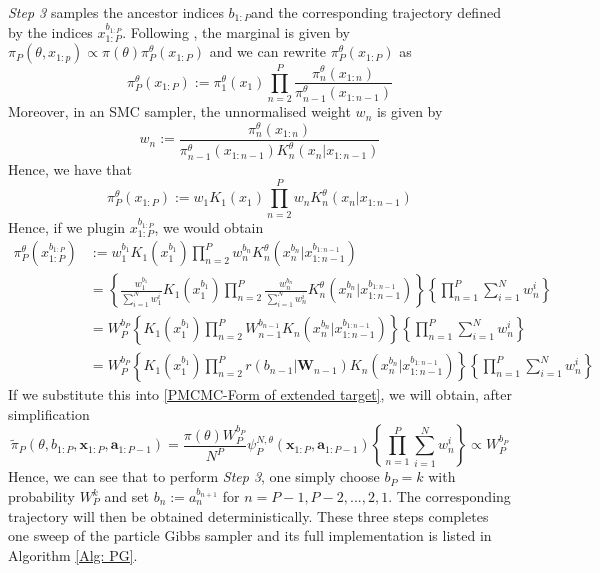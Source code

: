 \documentclass[12pt,a4paper]{article}
\begin{document}
\textit{Step 3} samples the ancestor indices \(b_{1:P}\)and the corresponding trajectory defined by the indices \(x_{1:P}^{b_{1:P}}\). Following \cite[Chapter~5]{lindsten2013backward}, the marginal is given by $\pi_P(\theta,x_{1:p}) \propto \pi(\theta)\pi^{\theta}_P(x_{1:P})$ and we can rewrite $\pi^{\theta}_P(x_{1:P})$ as 
\[
    \pi_{P}^{\theta}(x_{1:P}):= \pi_1^{\theta}(x_1) \prod_{n=2}^{P}\frac{\pi_n^{\theta}(x_{1:n})}{\pi_{n-1}^{\theta}(x_{1:n-1})} 
\]
Moreover, in an SMC sampler, the unnormalised weight \(w_n\) is given by 
\[
  w_n := \frac{\pi_n^{\theta}(x_{1:n})}{\pi_{n-1}^{\theta}(x_{1:n-1})K_n^{\theta}(x_n|x_{1:n-1})} 
\]
Hence, we have that 
\[
  \pi_P^{\theta}(x_{1:P}) := w_1K_1(x_1)\prod_{n=2}^{P} w_n K_n^{\theta}(x_n|x_{1:n-1})
\]
Hence, if we plugin \(x_{1:P}^{b_{1:P}}\), we would obtain 
\begin{equation}
    \label{PMCMC-another way of writing piP}
    \begin{split}
        \pi_P^{\theta}(x_{1:P}^{b_{1:P}}) &:= w_1^{b_1} K_1(x_1^{b_1})\prod_{n=2}^{P} w_n^{b_n} K_n^{\theta}(x_n^{b_n}|x_{1:n-1}^{b_{1:n-1}})\\
        &=\left\{\frac{w_1^{b_1}}{\sum_{i=1}^N w_1^i}K_1(x_1^{b_1})\prod_{n=2}^{P} \frac{w_n^{b_n}}{\sum_{i=1}^N w_n^i} K_n^{\theta}(x_n^{b_n}|x_{1:n-1}^{b_{1:n-1}})\right\}\left\{\prod_{n=1}^{P}\sum_{i=1}^N w_n^i\right\} \\
        &= W_P^{b_P}\left\{K_1(x_1^{b_1}) \prod_{n=2}^{P}W_{n-1}^{b_{n-1}}K_n(x_n^{b_n}|x_{1:n-1}^{b_{1:n-1}})\right\}\left\{\prod_{n=1}^{P}\sum_{i=1}^N w_n^i\right\} \\
        &=W_P^{b_P}\left\{K_1(x_1^{b_1}) \prod_{n=2}^{P}r(b_{n-1}|\mathbf{W}_{n-1})K_n(x_n^{b_n}|x_{1:n-1}^{b_{1:n-1}})\right\}\left\{\prod_{n=1}^{P}\sum_{i=1}^N w_n^i\right\}
    \end{split}
\end{equation}
If we substitute this into \eqref{PMCMC-Form of extended target}, we will obtain, after simplification 
\[
    \tilde{\pi}_P(\theta,b_{1:P},\mathbf{x}_{1:P},\mathbf{a}_{1:P-1}) = \frac{\pi(\theta)W_P^{b_P}}{N^P}\psi_P^{N,\theta}(\mathbf{x}_{1:P},\mathbf{a}_{1:P-1})\left\{\prod_{n=1}^{P}\sum_{i=1}^N w_n^i\right\}  \propto W_P^{b_P}
\]
Hence, we can see that to perform \textit{Step 3}, one simply choose \(b_P = k\) with probability \(W_P^k\) and set \(b_{n} := a_{n}^{b_{n+1}}\) for \(n=P-1,P-2,...,2,1\). The corresponding trajectory will then be obtained deterministically. These three steps completes one sweep of the particle Gibbs sampler and its full implementation is listed in Algorithm \ref{Alg: PG}.
\end{document}
